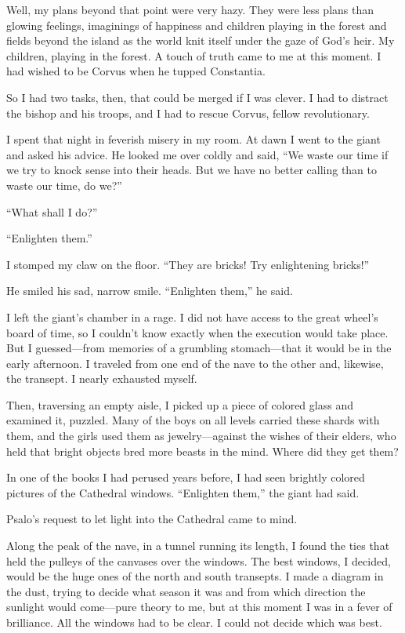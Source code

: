 Well, my plans beyond that point were very hazy. They were less plans than glowing feelings, imaginings of happiness and children playing in the forest and fields beyond the island as the world knit itself under the gaze of God's heir. My children, playing in the forest. A touch of truth came to me at this moment. I had wished to be Corvus when he tupped Constantia.

So I had two tasks, then, that could be merged if I was clever. I had to distract the bishop and his troops, and I had to rescue Corvus, fellow revolutionary.

I spent that night in feverish misery in my room. At dawn I went to the giant and asked his advice. He looked me over coldly and said, ``We waste our time if we try to knock sense into their heads. But we have no better calling than to waste our time, do we?''

``What shall I do?''

``Enlighten them.''

I stomped my claw on the floor. ``They are bricks! Try enlightening bricks!''

He smiled his sad, narrow smile. ``Enlighten them,'' he said.

I left the giant's chamber in a rage. I did not have access to the great wheel's board of time, so I couldn't know exactly when the execution would take place. But I guessed—from memories of a grumbling stomach—that it would be in the early afternoon. I traveled from one end of the nave to the other and, likewise, the transept. I nearly exhausted myself.

Then, traversing an empty aisle, I picked up a piece of colored glass and examined it, puzzled. Many of the boys on all levels carried these shards with them, and the girls used them as jewelry—against the wishes of their elders, who held that bright objects bred more beasts in the mind. Where did they get them?

In one of the books I had perused years before, I had seen brightly colored pictures of the Cathedral windows. ``Enlighten them,'' the giant had said.

Psalo's request to let light into the Cathedral came to mind.

Along the peak of the nave, in a tunnel running its length, I found the ties that held the pulleys of the canvases over the windows. The best windows, I decided, would be the huge ones of the north and south transepts. I made a diagram in the dust, trying to decide what season it was and from which direction the sunlight would come—pure theory to me, but at this moment I was in a fever of brilliance. All the windows had to be clear. I could not decide which was best.

